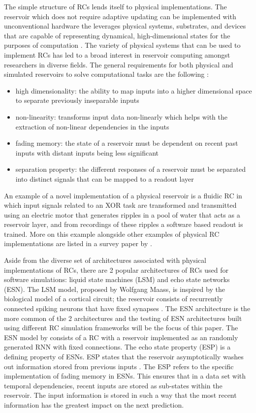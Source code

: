 \documentclass[a4paper,fleqn]{cas-dc}
\begin{document}
The simple structure of RCs lends itself to physical implementations. The reservoir which does not require adaptive updating can be implemented with unconventional hardware the leverages physical systems, substrates, and devices that are capable of representing dynamical, high-dimensional states for the purposes of computation \cite{cucchi_hands-reservoir_2022}. The variety of physical systems that can be used to implement RCs has led to a broad interest in reservoir computing amongst researchers in diverse fields. The general requirements for both physical and simulated reservoirs to solve computational tasks are the following \citep{tanaka_recent_2019}:
\begin{itemize}
    \item high dimensionality: the ability to map inputs into a higher dimensional space to separate previously inseparable inputs
    \item non-linearity: transforms input data non-linearly which helps with the extraction of non-linear dependencies in the inputs
    \item fading memory: the state of a reservoir must be dependent on recent past inputs with distant inputs being less significant
    \item separation property: the different responses of a reservoir must be separated into distinct signals that can be mapped to a readout layer
\end{itemize}
An example of a novel implementation of a physical reservoir is a fluidic RC in which input signals related to an XOR task are transformed and transmitted using an electric motor that generates ripples in a pool of water that acts as a reservoir layer, and from recordings of these ripples a software based readout is trained. More on this example alongside other examples of physical RC implementations are listed in a survey paper by \cite{tanaka_recent_2019}.


Aside from the diverse set of architectures associated with physical implementations of RCs, there are 2 popular architectures of RCs used for software simulations: liquid state machines (LSM) and echo state networks (ESN). The LSM model, proposed by Wolfgang Maass, is inspired by the biological model of a cortical circuit; the reservoir consists of recurrently connected spiking neurons that have fixed synapses \citep{deckers2022extended}. The ESN architecture is the more common of the 2 architectures and the testing of ESN architectures built using different RC simulation frameworks will be the focus of this paper. The ESN model by \cite{jaeger2001short} consists of a RC with a reservoir implemented as an randomly generated RNN with fixed connections. The echo state property (ESP) is a defining property of ESNs. ESP states that the reservoir asymptotically washes out information stored from previous inputs \citep{jaeger2007echo}. The ESP refers to the specific implementation of  fading memory in ESNs. This ensures that in a data set with temporal dependencies, recent inputs are stored as sub-states within the reservoir. The input information is stored in such a way that the most recent information has the greatest impact on the next prediction. 
\end{document}
